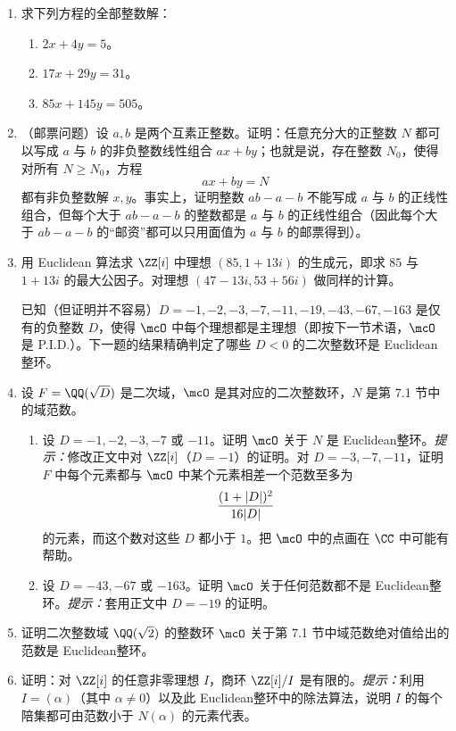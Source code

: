 \begin{enumerate}[label=\arabic*.]
	\item 求下列方程的全部整数解：
	\begin{enumerate}[label=(\alph*)]
		\item $2x+4y=5$。
		\item $17x+29y=31$。
		\item $85x+145y=505$。
	\end{enumerate}
	
	\item （邮票问题）设 $a,b$ 是两个互素正整数。证明：任意充分大的正整数 $N$ 都可以写成 $a$ 与 $b$ 的非负整数线性组合 $ax+by$；也就是说，存在整数 $N_0$，使得对所有 $N\geq N_0$，方程
	\[
	ax+by=N
	\]
	都有非负整数解 $x,y$。事实上，证明整数 $ab-a-b$ 不能写成 $a$ 与 $b$ 的正线性组合，但每个大于 $ab-a-b$ 的整数都是 $a$ 与 $b$ 的正线性组合（因此每个大于 $ab-a-b$ 的“邮资”都可以只用面值为 $a$ 与 $b$ 的邮票得到）。
	
	\item 用 Euclidean 算法求 $\ZZ[i]$ 中理想 $(85,1+13i)$ 的生成元，即求 $85$ 与 $1+13i$ 的最大公因子。对理想 $(47-13i,53+56i)$ 做同样的计算。
	
	\noindent 已知（但证明并不容易）$D=-1,-2,-3,-7,-11,-19,-43,-67,-163$ 是仅有的负整数 $D$，使得 $\mcO$ 中每个理想都是主理想（即按下一节术语，$\mcO$ 是 P.I.D.）。下一题的结果精确判定了哪些 $D<0$ 的二次整数环是 Euclidean整环。
	
	\item 设 $F=\QQ(\sqrt D)$ 是二次域，$\mcO$ 是其对应的二次整数环，$N$ 是第 7.1 节中的域范数。
	\begin{enumerate}[label=(\alph*)]
		\item 设 $D=-1,-2,-3,-7$ 或 $-11$。证明 $\mcO$ 关于 $N$ 是 Euclidean整环。\emph{提示：}修改正文中对 $\ZZ[i]$（$D=-1$）的证明。对 $D=-3,-7,-11$，证明 $F$ 中每个元素都与 $\mcO$ 中某个元素相差一个范数至多为
		\[
		{(1+|D|)^2\over 16|D|}
		\]
		的元素，而这个数对这些 $D$ 都小于 $1$。把 $\mcO$ 中的点画在 $\CC$ 中可能有帮助。
		\item 设 $D=-43,-67$ 或 $-163$。证明 $\mcO$ 关于任何范数都不是 Euclidean整环。\emph{提示：}套用正文中 $D=-19$ 的证明。
	\end{enumerate}
	
	\item 证明二次整数域 $\QQ(\sqrt2)$ 的整数环 $\mcO$ 关于第 7.1 节中域范数绝对值给出的范数是 Euclidean整环。
	
	\item 证明：对 $\ZZ[i]$ 的任意非零理想 $I$，商环 $\ZZ[i]/I$ 是有限的。\emph{提示：}利用 $I=(\alpha)$（其中 $\alpha\neq0$）以及此 Euclidean整环中的除法算法，说明 $I$ 的每个陪集都可由范数小于 $N(\alpha)$ 的元素代表。
	

\end{enumerate}
